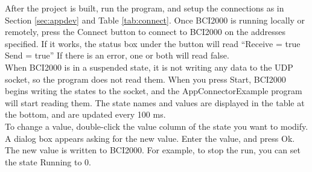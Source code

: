 After the project is built, run the program, and setup the connections as in Section \ref{sec:appdev} and Table \ref{tab:connect}. Once BCI2000 is running locally or remotely, press the Connect button to connect to BCI2000 on the addresses specified. If it works, the status box under the button will read ``Receive = true  Send = true'' If there is an error, one or both will read false.\\
When BCI2000 is in a suspended state, it is not writing any data to the UDP socket, so the program does not read them. When you press Start, BCI2000 begins writing the states to the socket, and the AppConnectorExample program will start reading them. The state names and values are displayed in the table at the bottom, and are updated every 100 ms.\\
To change a value, double-click the value column of the state you want to modify. A dialog box appears asking for the new value. Enter the value, and press Ok. The new value is written to BCI2000. For example, to stop the run, you can set the state Running to 0.